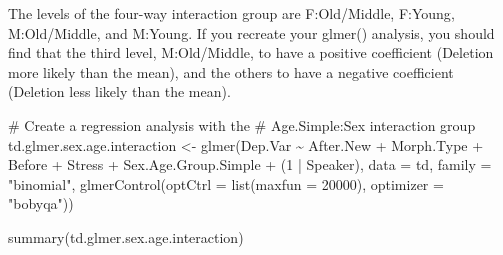 \documentclass[
  10pt,
  letterpaper]{article}
\newenvironment{Shaded}{\begin{snugshade}}{\end{snugshade}}
\newcommand{\AttributeTok}[1]{\textcolor[rgb]{0.40,0.45,0.13}{#1}}
\newcommand{\CommentTok}[1]{\textcolor[rgb]{0.37,0.37,0.37}{#1}}
\newcommand{\DecValTok}[1]{\textcolor[rgb]{0.68,0.00,0.00}{#1}}
\newcommand{\FunctionTok}[1]{\textcolor[rgb]{0.28,0.35,0.67}{#1}}
\newcommand{\NormalTok}[1]{\textcolor[rgb]{0.00,0.23,0.31}{#1}}
\newcommand{\OtherTok}[1]{\textcolor[rgb]{0.00,0.23,0.31}{#1}}
\newcommand{\SpecialCharTok}[1]{\textcolor[rgb]{0.37,0.37,0.37}{#1}}
\newcommand{\StringTok}[1]{\textcolor[rgb]{0.13,0.47,0.30}{#1}}
\renewcommand\texttt[1]{{\ttfamily\color{BrickRed}#1}}
\begin{document}
The levels of the four-way interaction group are \texttt{F:Old/Middle},
\texttt{F:Young}, \texttt{M:Old/Middle}, and \texttt{M:Young}. If you
recreate your \texttt{glmer()} analysis, you should find that the third
level, \texttt{M:Old/Middle}, to have a positive coefficient
(\texttt{Deletion} more likely than the mean), and the others to have a
negative coefficient (\texttt{Deletion} less likely than the mean).

\begin{Shaded}
\begin{Highlighting}[]
\CommentTok{\# Create a regression analysis with the}
\CommentTok{\# Age.Simple:Sex interaction group}
\NormalTok{td.glmer.sex.age.interaction }\OtherTok{\textless{}{-}} \FunctionTok{glmer}\NormalTok{(Dep.Var }\SpecialCharTok{\textasciitilde{}}\NormalTok{ After.New }\SpecialCharTok{+}
\NormalTok{    Morph.Type }\SpecialCharTok{+}\NormalTok{ Before }\SpecialCharTok{+}\NormalTok{ Stress }\SpecialCharTok{+}\NormalTok{ Sex.Age.Group.Simple }\SpecialCharTok{+}
\NormalTok{    (}\DecValTok{1} \SpecialCharTok{|}\NormalTok{ Speaker), }\AttributeTok{data =}\NormalTok{ td, }\AttributeTok{family =} \StringTok{"binomial"}\NormalTok{,}
    \FunctionTok{glmerControl}\NormalTok{(}\AttributeTok{optCtrl =} \FunctionTok{list}\NormalTok{(}\AttributeTok{maxfun =} \DecValTok{20000}\NormalTok{), }\AttributeTok{optimizer =} \StringTok{"bobyqa"}\NormalTok{))}

\FunctionTok{summary}\NormalTok{(td.glmer.sex.age.interaction)}
\end{Highlighting}
\end{Shaded}
\end{document}
